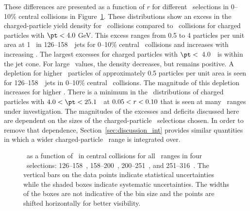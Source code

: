 These differences are presented as a function of $r$ for different \pt\ selections in 0--10\% central collisions in Figure~\ref{fig:deltadptr}. 
These distributions show an excess  in the charged-particle yield density for \pbpb\ collisions compared to \pp\ collisions for charged particles with $\pt <4.0$ GeV. This excess ranges from 0.5 to 4 particles per unit area at 1 \GeV\ in 126--158~\GeV\ jets for 0--10\% central \pbpb\ collisions and increases with increasing \ptjet. 
The largest excesses for charged particles with $\pt <$~4.0~\GeV\ is within the jet cone.  For large \rvar\ values, the
density decreases, but remains positive.
A depletion for higher \pt\ particles of approximately 0.5 particles per unit area is seen for 126--158~\GeV\ jets in 0--10\% central \pbpb\ collisions. The magnitude of this depletion increases for higher \ptjet. 
There is a minimum in the \DeltaDptr\ distributions of charged 
particles with \mbox{$ 4.0 < \pt <  25.1$}~\GeV\ at $0.05 < \mbox{$r$} < 0.10$ that is seen at many \ptjet\ ranges under investigation.
The magnitudes of the excesses and deficits discussed here are dependent on the sizes of the charged-particle \pt\ selections
chosen.  In order to remove that dependence, Section~\ref{sec:discussion_int} provides similar quantities in which a
wider charged-particle \pt\ range is integrated over.

\begin{figure}
   \caption{\DeltaDptr\ as a function of \rvar\ in central collisions for all \pt\ ranges in four \ptjet\ selections: 126--158~\GeV, 158--200~\GeV, 200--251~\GeV, and 251--316~\GeV. The vertical bars on the data points indicate statistical uncertainties while the shaded boxes indicate systematic uncertainties. The widths of the boxes are not indicative of the bin size and the points are shifted horizontally for better visibility. }
      \label{fig:deltadptr}
\end{figure}
\FloatBarrier

